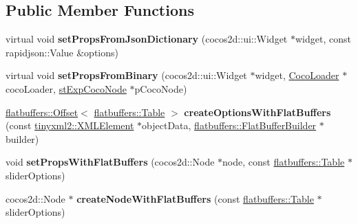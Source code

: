 \subsection*{Public Member Functions}
\begin{DoxyCompactItemize}
\item 
\mbox{\label{classcocostudio_1_1SliderReader_a5549b8912090b578335df38fa45eb3c9}} 
virtual void {\bfseries set\+Props\+From\+Json\+Dictionary} (cocos2d\+::ui\+::\+Widget $\ast$widget, const rapidjson\+::\+Value \&options)
\item 
\mbox{\label{classcocostudio_1_1SliderReader_a945068c23683a82c3c7d952ce57cbbf3}} 
virtual void {\bfseries set\+Props\+From\+Binary} (cocos2d\+::ui\+::\+Widget $\ast$widget, \hyperlink{classcocostudio_1_1CocoLoader}{Coco\+Loader} $\ast$coco\+Loader, \hyperlink{structcocostudio_1_1stExpCocoNode}{st\+Exp\+Coco\+Node} $\ast$p\+Coco\+Node)
\item 
\mbox{\label{classcocostudio_1_1SliderReader_a60fbf693410a541cce2f54b6a58d87f6}} 
\hyperlink{structflatbuffers_1_1Offset}{flatbuffers\+::\+Offset}$<$ \hyperlink{classflatbuffers_1_1Table}{flatbuffers\+::\+Table} $>$ {\bfseries create\+Options\+With\+Flat\+Buffers} (const \hyperlink{classtinyxml2_1_1XMLElement}{tinyxml2\+::\+X\+M\+L\+Element} $\ast$object\+Data, \hyperlink{classflatbuffers_1_1FlatBufferBuilder}{flatbuffers\+::\+Flat\+Buffer\+Builder} $\ast$builder)
\item 
\mbox{\label{classcocostudio_1_1SliderReader_ac300a0f09a00bb4f77d6931bc1a11736}} 
void {\bfseries set\+Props\+With\+Flat\+Buffers} (cocos2d\+::\+Node $\ast$node, const \hyperlink{classflatbuffers_1_1Table}{flatbuffers\+::\+Table} $\ast$slider\+Options)
\item 
\mbox{\label{classcocostudio_1_1SliderReader_a9505f13e79a75e3a6853e11092b9a1e2}} 
cocos2d\+::\+Node $\ast$ {\bfseries create\+Node\+With\+Flat\+Buffers} (const \hyperlink{classflatbuffers_1_1Table}{flatbuffers\+::\+Table} $\ast$slider\+Options)
\item 
\mbox{\label{classcocostudio_1_1SliderReader_aa066411b005860be04bc429a5a8898bf}} 

\end{DoxyCompactItemize}
